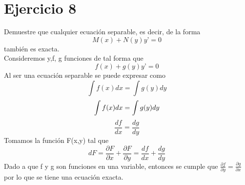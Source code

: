 \section{Ejercicio 8}

Demuestre que cualquier ecuación separable, es decir, de la forma \\
\begin{equation*}
M(x)+N(y)y’=0
\end{equation*}
también es exacta. \\
Consideremos y,f, g funciones de tal forma que
\begin{equation*}
f(x)+g(y)y’=0
\end{equation*}
Al ser una ecuación separable se puede expresar como
\begin{equation*}
\int f(x)dx= \int g(y)dy 
\end{equation*}
\begin{equation*}
\int f(x)dx= \int g(y)dy \\
\end{equation*}
\begin{equation*}
    \frac{df}{dx}=\frac{dg}{dy}
\end{equation*}
Tomamos la función F(x,y) tal que
\begin{equation*}
    dF=\frac{\partial F}{\partial x} + \frac{\partial F}{\partial y}=\frac{df}{dx} +\frac{dg}{dy}
\end{equation*}
Dado a que f y g son funciones en una variable, entonces se cumple que $\frac{\partial f}{\partial y} = \frac{\partial g}{\partial x}$  por lo que se tiene una ecuación exacta.